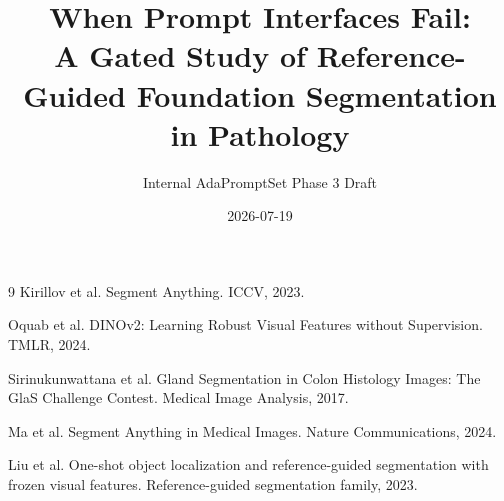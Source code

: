 \documentclass[11pt,twocolumn]{article}
\title{When Prompt Interfaces Fail:\\A Gated Study of Reference-Guided Foundation Segmentation in Pathology}
\author{Internal AdaPromptSet Phase 3 Draft}
\date{2026-07-19}
\begin{document}
\maketitle












\begin{thebibliography}{9}
Kirillov et al. Segment Anything. ICCV, 2023.

Oquab et al. DINOv2: Learning Robust Visual Features without Supervision. TMLR, 2024.

Sirinukunwattana et al. Gland Segmentation in Colon Histology Images: The GlaS Challenge Contest. Medical Image Analysis, 2017.

Ma et al. Segment Anything in Medical Images. Nature Communications, 2024.

Liu et al. One-shot object localization and reference-guided segmentation with frozen visual features. Reference-guided segmentation family, 2023.
\end{thebibliography}
\end{document}
